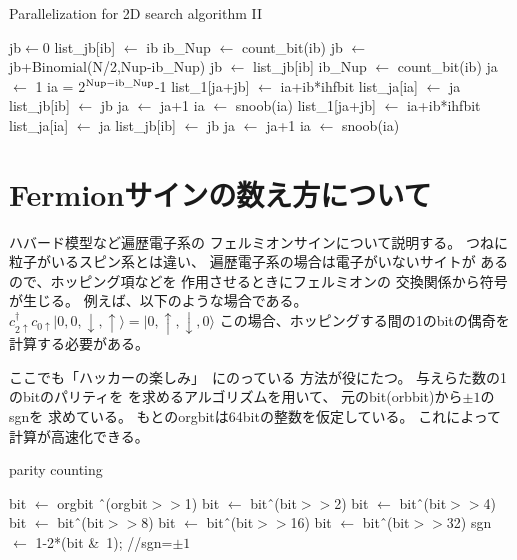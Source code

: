 \documentclass[prb,aps,showpacs,preprint,nofootinbib]{revtex4}
\newcommand{\lef}{\leftarrow}
\newcommand{\up}{\uparrow}
\newcommand{\down}{\downarrow}
\begin{document}
\begin{algorithm}                      
\caption{Parallelization for 2D search algorithm II}         
\label{alg:PHack}                          
\begin{algorithmic}                  
\STATE jb$\lef 0$
  \STATE list\_jb[ib] $\lef$ ib
  \STATE ib\_Nup $\lef$ count\_bit(ib)
  \STATE jb $\lef$ jb+Binomial(N/2,Nup-ib\_Nup)
\ENDFOR
{}
  \STATE jb $\lef$ list\_jb[ib]
  \STATE ib\_Nup $\lef$ count\_bit(ib)
  \STATE ja $\lef$ 1 
      \STATE ia = 2$^{\rm Nup-ib\_Nup}$-1
        \STATE list\_1[ja+jb] $\lef$ ia+ib*ihfbit
        \STATE list\_ja[ia] $\lef$ ja
        \STATE list\_jb[ib] $\lef$ jb
        \STATE ja $\lef$ ja+1
          \STATE ia $\lef$ snoob(ia)
             \STATE list\_1[ja+jb] $\lef$ ia+ib*ihfbit
             \STATE list\_ja[ia] $\lef$ ja
             \STATE list\_jb[ib] $\lef$ jb
             \STATE ja $\lef$ ja+1
             \STATE ia $\lef$ snoob(ia)
          \ENDWHILE
        \ENDIF
      \ENDIF
    \ENDIF
\ENDFOR
\end{algorithmic}
\end{algorithm}

\newpage

\section{Fermionサインの数え方について}
ハバード模型など遍歴電子系の
フェルミオンサインについて説明する。
つねに粒子がいるスピン系とは違い、
遍歴電子系の場合は電子がいないサイトが
あるので、ホッピング項などを
作用させるときにフェルミオンの
交換関係から符号が生じる。
例えば、以下のような場合である。
$c^{\dagger}_{2\up}c_{0\up}|0,0,\down,\up\rangle=|0,\up,\down,0\rangle$
この場合、ホッピングする間の1のbitの偶奇を
計算する必要がある。

ここでも「ハッカーの楽しみ」~\cite{hacker}にのっている
方法が役にたつ。
与えらた数の1のbitのパリティを
を求めるアルゴリズムを用いて、
元のbit(orbbit)から$\pm1$のsgnを
求めている。
もとのorgbitは64bitの整数を仮定している。
これによって計算が高速化できる。

\begin{algorithm}                      
\caption{parity counting}         
\begin{algorithmic}                  
\STATE   bit  $\lef$   orgbit \^\ (orgbit$>>$1)
\STATE   bit  $\lef$   bit\^\ (bit$>>$2)
\STATE   bit  $\lef$   bit\^\ (bit$>>$4)
\STATE   bit  $\lef$   bit\^\ (bit$>>$8)
\STATE   bit  $\lef$   bit\^\ (bit$>>$16)
\STATE   bit  $\lef$   bit\^\ (bit$>>$32)
\STATE   sgn  $\lef$   1-2*(bit \&\ 1); //sgn=$\pm 1$
\end{algorithmic}
\label{alg:snoob}                          
\end{algorithm}



\end{document}
